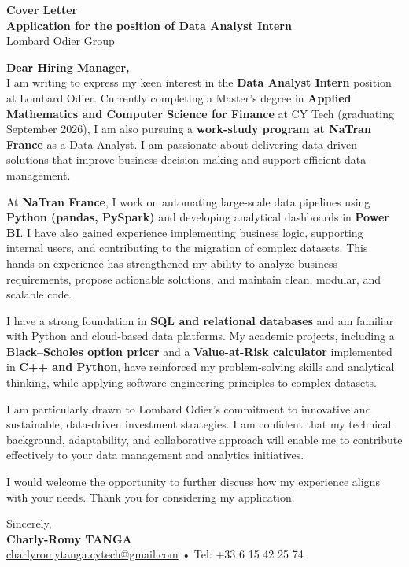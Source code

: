 \documentclass[a4paper,10pt]{article}
\begin{document}
\begin{center}
    {\LARGE \textbf{Cover Letter}}\\[8pt]
    \textbf{Application for the position of Data Analyst Intern}\\[4pt]
    Lombard Odier Group
\end{center}

\vspace{0.6cm}

\noindent
\textbf{Dear Hiring Manager,}\\[6pt]

I am writing to express my keen interest in the \textbf{Data Analyst Intern} position at Lombard Odier.  
Currently completing a Master’s degree in \textbf{Applied Mathematics and Computer Science for Finance} at CY Tech (graduating September 2026), I am also pursuing a \textbf{work-study program at NaTran France} as a Data Analyst.  
I am passionate about delivering data-driven solutions that improve business decision-making and support efficient data management.

At \textbf{NaTran France}, I work on automating large-scale data pipelines using \textbf{Python (pandas, PySpark)} and developing analytical dashboards in \textbf{Power BI}.  
I have also gained experience implementing business logic, supporting internal users, and contributing to the migration of complex datasets.  
This hands-on experience has strengthened my ability to analyze business requirements, propose actionable solutions, and maintain clean, modular, and scalable code.

I have a strong foundation in \textbf{SQL and relational databases} and am familiar with Python and cloud-based data platforms.  
My academic projects, including a \textbf{Black–Scholes option pricer} and a \textbf{Value-at-Risk calculator} implemented in \textbf{C++ and Python}, have reinforced my problem-solving skills and analytical thinking, while applying software engineering principles to complex datasets.

I am particularly drawn to Lombard Odier’s commitment to innovative and sustainable, data-driven investment strategies.  
I am confident that my technical background, adaptability, and collaborative approach will enable me to contribute effectively to your data management and analytics initiatives.

I would welcome the opportunity to further discuss how my experience aligns with your needs.  
Thank you for considering my application.

\vspace{1cm}

\noindent
Sincerely,\\[4pt]
\textbf{Charly-Romy TANGA}\\
\href{mailto:charlyromytanga.cytech@gmail.com}{charlyromytanga.cytech@gmail.com} • Tel: +33 6 15 42 25 74
\end{document}
